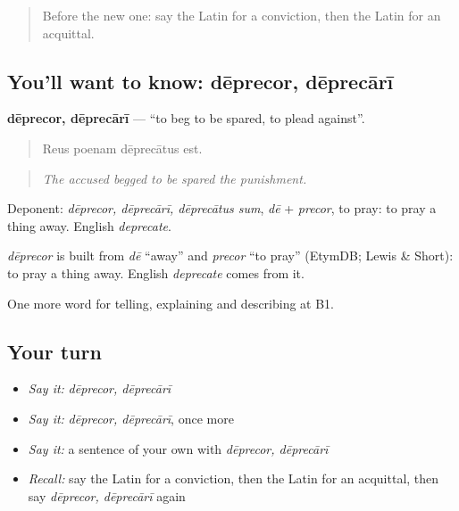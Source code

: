 \label{lesson:LA-C413-deprecor}



\begin{quote}
Before the new one: say the Latin for a conviction, then the Latin for an acquittal.
\end{quote}

\subsection*{You'll want to know: dēprecor, dēprecārī}
\textbf{dēprecor, dēprecārī} — \textquotedblleft{}to beg to be spared, to plead against\textquotedblright{}.

\begin{quote}
Reus poenam dēprecātus est.
\end{quote}

\begin{quote}
\emph{The accused begged to be spared the punishment.}
\end{quote}

Deponent: \emph{dēprecor, dēprecārī, dēprecātus sum}, \emph{dē} + \emph{precor}, to pray: to pray a thing away. English \emph{deprecate}.

\begin{cousinweb}
\emph{dēprecor} is built from \emph{dē} \textquotedblleft{}away\textquotedblright{} and \emph{precor} \textquotedblleft{}to pray\textquotedblright{} (EtymDB; Lewis \& Short): to pray a thing away. English \emph{deprecate} comes from it.
\end{cousinweb}

\begin{grammarlens}[title={What you've built}]
One more word for telling, explaining and describing at B1.
\end{grammarlens}

\subsection*{Your turn}
\begin{itemize}
\raggedright
  \item \emph{Say it:} \emph{dēprecor, dēprecārī}
  \item \emph{Say it:} \emph{dēprecor, dēprecārī}, once more
  \item \emph{Say it:} a sentence of your own with \emph{dēprecor, dēprecārī}
  \item \emph{Recall:} say the Latin for a conviction, then the Latin for an acquittal, then say \emph{dēprecor, dēprecārī} again
\end{itemize}

